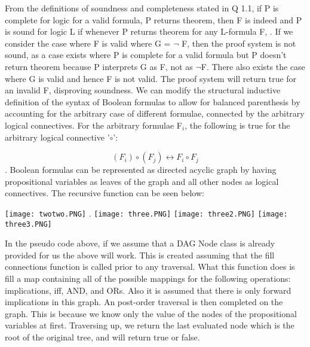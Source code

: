 \documentclass[11pt]{article}
\begin{document}
\begin{enumerate}
From the definitions of soundness and completeness stated in Q 1.1, if P is complete for logic for a valid formula, P returns theorem, then F is indeed and P is sound for logic L if whenever P returns theorem for any L-formula F, . If we consider the case  where F is valid where G = $\neg$ F, then the proof system is not sound, as a case exists where P is complete for a valid formula but P doesn't return theorem because P interprets G as F, not as $\neg$F. There also exists the case where G is valid and hence \neg F is not valid. The proof system will return true for an invalid F, disproving soundness.
\newpage 
{} 
\newline
We can modify the structural inductive definition of the syntax of Boolean formulas to allow for balanced parenthesis by accounting for the arbitrary case of different formulae, connected by the arbitrary logical connectives. For the arbitrary formulae F$_i$,  the following is true for the arbitrary logical connective '$\circ$': 

\begin{equation}
    (F_i) \circ (F_j) \leftrightarrow F_i \circ F_j
\end{equation}
\newline 
{}.
\newline
Boolean formulas can be represented as directed acyclic graph by having propositional variables as leaves of the graph and all other nodes as logical connectives. The recursive function can be seen below:

\texttt{[image: twotwo.PNG]}
. 
\newline 
\texttt{[image: three.PNG]}
\texttt{[image: three2.PNG]}
\texttt{[image: three3.PNG]}

\newpage

In the pseudo code above, if we assume that a DAG Node class is already provided for us the above will work. This is created assuming that the fill connections function is called prior to any traversal. What this function does is fill a map containing all of the possible mappings for the following operations: implications, iff, AND, and ORs. Also it is assumed that there is only forward implications in this graph. An post-order traversal is then completed on the graph. This is because we know only the value of the nodes of the propositional variables at first. Traversing up, we return the last evaluated node which is the root of the original tree, and will return true or false.


\end{enumerate}
\end{document}
